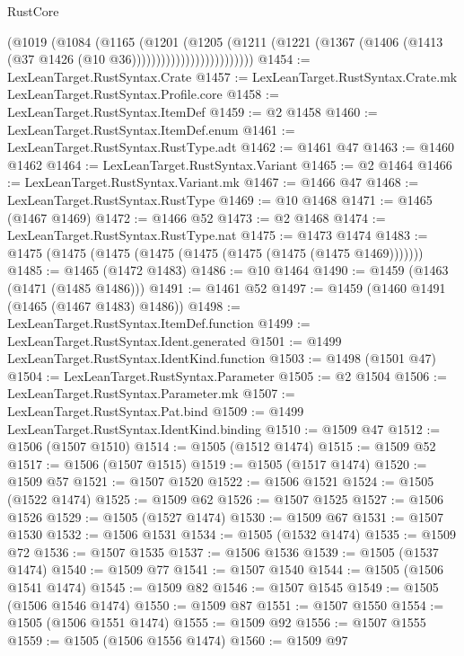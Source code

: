 \begin{lexlean}{RustCore}
\begin{coremodule}
                              (@1019
                                (@1084
                                  (@1165
                                    (@1201
                                      (@1205
                                        (@1211
                                          (@1221
                                            (@1367
                                              (@1406
                                                (@1413 (@37 @1426 (@10 @36)))))))))))))))))))))))))
@1454 := LexLeanTarget.RustSyntax.Crate
@1457 := LexLeanTarget.RustSyntax.Crate.mk LexLeanTarget.RustSyntax.Profile.core
@1458 := LexLeanTarget.RustSyntax.ItemDef
@1459 := @2 @1458
@1460 := LexLeanTarget.RustSyntax.ItemDef.enum
@1461 := LexLeanTarget.RustSyntax.RustType.adt
@1462 := @1461 @47
@1463 := @1460 @1462
@1464 := LexLeanTarget.RustSyntax.Variant
@1465 := @2 @1464
@1466 := LexLeanTarget.RustSyntax.Variant.mk
@1467 := @1466 @47
@1468 := LexLeanTarget.RustSyntax.RustType
@1469 := @10 @1468
@1471 := @1465 (@1467 @1469)
@1472 := @1466 @52
@1473 := @2 @1468
@1474 := LexLeanTarget.RustSyntax.RustType.nat
@1475 := @1473 @1474
@1483 := @1475 (@1475 (@1475 (@1475 (@1475 (@1475 (@1475 (@1475 @1469)))))))
@1485 := @1465 (@1472 @1483)
@1486 := @10 @1464
@1490 := @1459 (@1463 (@1471 (@1485 @1486)))
@1491 := @1461 @52
@1497 := @1459 (@1460 @1491 (@1465 (@1467 @1483) @1486))
@1498 := LexLeanTarget.RustSyntax.ItemDef.function
@1499 := LexLeanTarget.RustSyntax.Ident.generated
@1501 := @1499 LexLeanTarget.RustSyntax.IdentKind.function
@1503 := @1498 (@1501 @47)
@1504 := LexLeanTarget.RustSyntax.Parameter
@1505 := @2 @1504
@1506 := LexLeanTarget.RustSyntax.Parameter.mk
@1507 := LexLeanTarget.RustSyntax.Pat.bind
@1509 := @1499 LexLeanTarget.RustSyntax.IdentKind.binding
@1510 := @1509 @47
@1512 := @1506 (@1507 @1510)
@1514 := @1505 (@1512 @1474)
@1515 := @1509 @52
@1517 := @1506 (@1507 @1515)
@1519 := @1505 (@1517 @1474)
@1520 := @1509 @57
@1521 := @1507 @1520
@1522 := @1506 @1521
@1524 := @1505 (@1522 @1474)
@1525 := @1509 @62
@1526 := @1507 @1525
@1527 := @1506 @1526
@1529 := @1505 (@1527 @1474)
@1530 := @1509 @67
@1531 := @1507 @1530
@1532 := @1506 @1531
@1534 := @1505 (@1532 @1474)
@1535 := @1509 @72
@1536 := @1507 @1535
@1537 := @1506 @1536
@1539 := @1505 (@1537 @1474)
@1540 := @1509 @77
@1541 := @1507 @1540
@1544 := @1505 (@1506 @1541 @1474)
@1545 := @1509 @82
@1546 := @1507 @1545
@1549 := @1505 (@1506 @1546 @1474)
@1550 := @1509 @87
@1551 := @1507 @1550
@1554 := @1505 (@1506 @1551 @1474)
@1555 := @1509 @92
@1556 := @1507 @1555
@1559 := @1505 (@1506 @1556 @1474)
@1560 := @1509 @97

\end{coremodule}
\end{lexlean}
